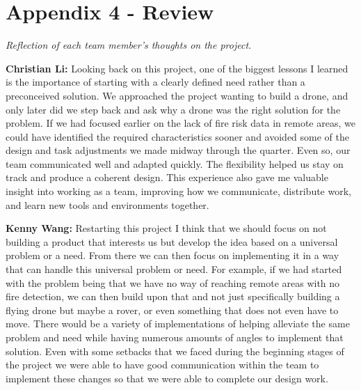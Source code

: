 \documentclass[journal, onecolumn]{IEEEtran}
\begin{document}
\newpage

\section{Appendix 4 - Review}

\textit{Reflection of each team member's thoughts on the project.}

\vspace{1em}

\textbf{Christian Li:} Looking back on this project, one of the biggest lessons I learned is the importance of starting with a clearly defined need rather than a preconceived solution. We approached the project wanting to build a drone, and only later did we step back and ask why a drone was the right solution for the problem. If we had focused earlier on the lack of fire risk data in remote areas, we could have identified the required characteristics sooner and avoided some of the design and task adjustments we made midway through the quarter. Even so, our team communicated well and adapted quickly. The flexibility helped us stay on track and produce a coherent design. This experience also gave me valuable insight into working as a team, improving how we communicate, distribute work, and learn new tools and environments together.

\vspace{1em}

\textbf{Kenny Wang:} Restarting this project I think that we should focus on not building a product that interests us but develop the idea based on a universal problem or a need. From there we can then focus on implementing it in a way that can handle this universal problem or need. For example, if we had started with the problem being that we have no way of reaching remote areas with no fire detection, we can then build upon that and not just specifically building a flying drone but maybe a rover, or even something that does not even have to move. There would be a variety of implementations of helping alleviate the same problem and need while having numerous amounts of angles to implement that solution. Even with some setbacks that we faced during the beginning stages of the project we were able to have good communication within the team to implement these changes so that we were able to complete our design work.

\vspace{1em}
\end{document}
